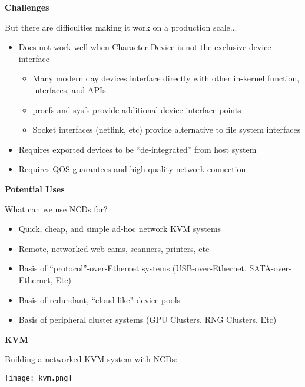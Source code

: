 \documentclass[handout]{beamer}
\begin{document}
\begin{frame}{\bf Challenges}

But there are difficulties making it work on a production scale...

\begin{itemize}
\item<1-> Does not work well when Character Device is not the exclusive
  device interface
  \begin{itemize}
  \item Many modern day devices interface directly with other
    in-kernel function, interfaces, and APIs
  \item procfs and sysfs provide additional device interface points
  \item Socket interfaces (netlink, etc) provide alternative to file
    system interfaces
  \end{itemize}
\item<2-> Requires exported devices to be ``de-integrated'' from host system
\item<3-> Requires QOS guarantees and high quality network connection
\end{itemize}

\end{frame}

\begin{frame}{\bf Potential Uses}

What can we use NCDs for?

\begin{itemize}
\item<1-> Quick, cheap, and simple ad-hoc network KVM systems
\item<2-> Remote, networked web-cams, scanners, printers, etc
\item<3-> Basis of ``protocol''-over-Ethernet systems (USB-over-Ethernet,
  SATA-over-Ethernet, Etc)
\item<4-> Basis of redundant, ``cloud-like'' device pools
\item<5-> Basis of peripheral cluster systems (GPU Clusters, RNG Clusters,
  Etc)
\end{itemize}

\end{frame}

\begin{frame}{\bf KVM}

Building a networked KVM system with NCDs:

  \begin{center}
    \texttt{[image: kvm.png]}
  \end{center}

\end{frame}
\end{document}
